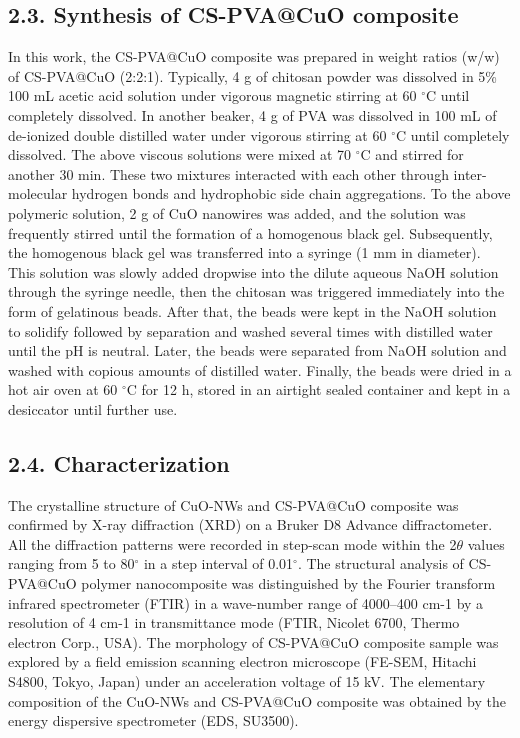 \documentclass[final,5p,times,twocolumn,authoryear]{elsarticle}
\begin{document}
\subsection{2.3. Synthesis of CS-PVA@CuO composite}
In this work, the CS-PVA@CuO composite was prepared in weight ratios (w/w) of CS-PVA@CuO (2:2:1). Typically, 4 g of chitosan powder was dissolved in 5\% 100 mL acetic acid solution under vigorous magnetic stirring at 60 $^\circ$C until completely dissolved. In another beaker, 4 g of PVA was dissolved in 100 mL of de-ionized double distilled water under vigorous stirring at 60 $^\circ$C until completely dissolved. The above viscous solutions were mixed at 70 $^\circ$C and stirred for another 30 min. These two mixtures interacted with each other through inter-molecular hydrogen bonds and hydrophobic side chain aggregations. To the above polymeric solution, 2 g of CuO nanowires was added, and the solution was frequently stirred until the formation of a homogenous black gel. Subsequently, the homogenous black gel was transferred into a syringe (1 mm in diameter). This solution was slowly added dropwise into the dilute aqueous NaOH solution through the syringe needle, then the chitosan was triggered immediately into the form of gelatinous beads. After that, the beads were kept in the NaOH solution to solidify followed by separation and washed several times with distilled water until the pH is neutral. Later, the beads were separated from NaOH solution and washed with copious amounts of distilled water. Finally, the beads were dried in a hot air oven at 60 $^\circ$C for 12 h, stored in an airtight sealed container and kept in a desiccator until further use.
\subsection{2.4. Characterization}
The crystalline structure of CuO-NWs and CS-PVA@CuO composite was confirmed by X-ray diffraction (XRD) on a Bruker D8 Advance diffractometer. All the diffraction patterns were recorded in step-scan mode within the 2$\theta$ values ranging from 5 to 80$^\circ$ in a step interval of 0.01$^\circ$. The structural analysis of CS-PVA@CuO polymer nanocomposite was distinguished by the Fourier transform infrared spectrometer (FTIR) in a wave-number range of 4000–400 cm-1 by a resolution of 4 cm-1 in transmittance mode (FTIR, Nicolet 6700, Thermo electron Corp., USA). The morphology of CS-PVA@CuO composite sample was explored by a field emission scanning electron microscope (FE-SEM, Hitachi S4800, Tokyo, Japan) under an acceleration voltage of 15 kV. The elementary composition of the CuO-NWs and CS-PVA@CuO composite was obtained by the energy dispersive spectrometer (EDS, SU3500).
\end{document}
